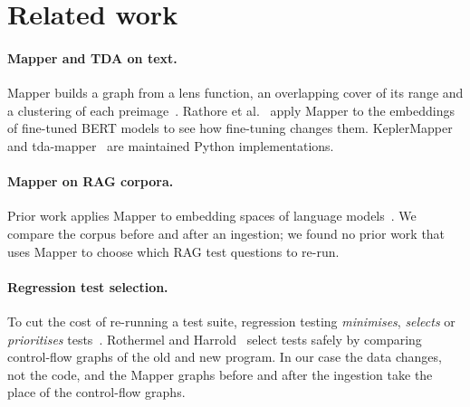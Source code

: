 \section{Related work}
\label{sec:related}

\paragraph{Mapper and TDA on text.}
Mapper builds a graph from a lens function, an overlapping cover of its
range and a clustering of each preimage~\cite{singh2007topological}.
Rathore et al.~\cite{rathore2023topobert} apply Mapper to the embeddings of
fine-tuned BERT models to see how fine-tuning changes them.
KeplerMapper~\cite{vanveen2019kepler} and
tda-mapper~\cite{simi2025tdamapper} are maintained Python implementations.

\paragraph{Mapper on RAG corpora.}
Prior work applies Mapper to embedding spaces of language
models~\cite{rathore2023topobert}. We compare the corpus before and after
an ingestion; we found no prior work that uses Mapper to choose which RAG
test questions to re-run.

\paragraph{Regression test selection.}
To cut the cost of re-running a test suite, regression testing
\emph{minimises}, \emph{selects} or \emph{prioritises}
tests~\cite{yoo2012regression}. Rothermel and Harrold~\cite{rothermel1997safe}
select tests safely by comparing control-flow graphs of the old and new
program. In our case the data changes, not the code, and the Mapper
graphs before and after the ingestion take the place of the control-flow
graphs.
